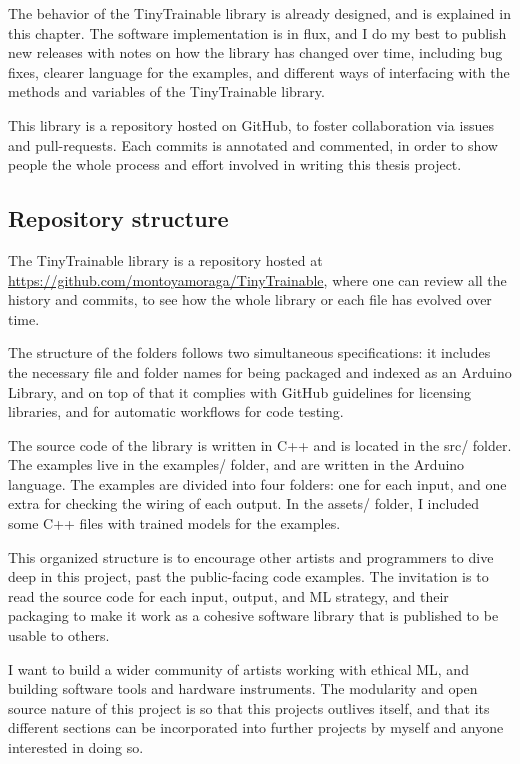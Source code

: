 The behavior of the TinyTrainable library is already designed, and is explained in this chapter. The software implementation is in flux, and I do my best to publish new releases with notes on how the library has changed over time, including bug fixes, clearer language for the examples, and different ways of interfacing with the methods and variables of the TinyTrainable library.

This library is a repository hosted on GitHub, to foster collaboration via \glspl{issue} and \glspl{pull-request}. Each \glspl{commit} is annotated and commented, in order to show people the whole process and effort involved in writing this thesis project.

\subsection{Repository structure}

The TinyTrainable library is a repository hosted at \url{https://github.com/montoyamoraga/TinyTrainable}, where one can review all the history and \glspl{commit}, to see how the whole library or each file has evolved over time.

The structure of the folders follows two simultaneous specifications: it includes the necessary file and folder names for being packaged and indexed as an Arduino Library, and on top of that it complies with GitHub guidelines for licensing libraries, and for automatic workflows for code testing.

The source code of the library is written in C++ and is located in the src/ folder. The examples live in the examples/ folder, and are written in the Arduino language. The examples are divided into four folders: one for each input, and one extra for checking the wiring of each output. In the assets/ folder, I included some C++ files with trained models for the examples.

This organized structure is to encourage other artists and programmers to dive deep in this project, past the public-facing code examples. The invitation is to read the source code for each input, output, and \acrshort{ML} strategy, and their packaging to make it work as a cohesive software library that is published to be usable to others.

I want to build a wider community of artists working with ethical \acrshort{ML}, and building software tools and hardware instruments. The modularity and open source nature of this project is so that this projects outlives itself, and that its different sections can be incorporated into further projects by myself and anyone interested in doing so.

